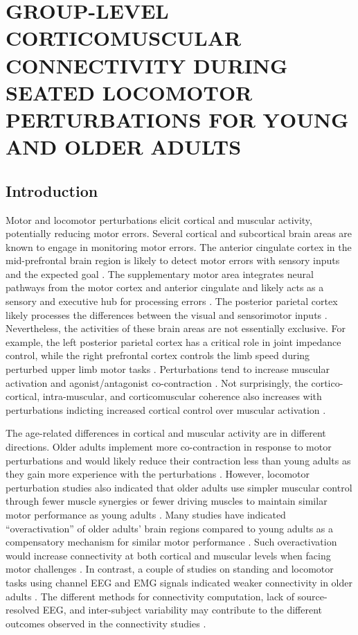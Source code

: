 \documentclass[../thesis_seyed.tex]{subfiles}
\begin{document}
\chapter{GROUP-LEVEL CORTICOMUSCULAR CONNECTIVITY DURING SEATED LOCOMOTOR PERTURBATIONS FOR YOUNG AND OLDER ADULTS}
\section{Introduction}

Motor and locomotor perturbations elicit cortical and muscular activity, potentially reducing motor errors. Several cortical and subcortical brain areas are known to engage in monitoring motor errors. The anterior cingulate cortex in the mid-prefrontal brain region is likely to detect motor errors with sensory inputs and the expected goal \cite{Holroyd2002-fl}. The supplementary motor area integrates neural pathways from the motor cortex and anterior cingulate and likely acts as a sensory and executive hub for processing errors \cite{Peterson2019-wz}. The posterior parietal cortex likely processes the differences between the visual and sensorimotor inputs \cite{Peterson2018-ht}. Nevertheless, the activities of these brain areas are not essentially exclusive. For example, the left posterior parietal cortex has a critical role in joint impedance control, while the right prefrontal cortex controls the limb speed during perturbed upper limb motor tasks \cite{Mutha2014-ea}. Perturbations tend to increase muscular activation and agonist/antagonist co-contraction \cite{Huang2014-to,Thoroughman1999-pz}. Not surprisingly, the cortico-cortical, intra-muscular, and corticomuscular coherence also increases with perturbations indicting increased cortical control over muscular activation \cite{Sato2019-qb,Zandvoort2019-xl,Gentili2015-pq}.

The age-related differences in cortical and muscular activity are in different directions. Older adults implement more co-contraction in response to motor perturbations and would likely reduce their contraction less than young adults as they gain more experience with the perturbations \cite{Huang2014-nh}. However, locomotor perturbation studies also indicated that older adults use simpler muscular control through fewer muscle synergies or fewer driving muscles to maintain similar motor performance as young adults \cite{Allen2018-kd,Da_Silva_Costa2020-vl}. Many studies have indicated “overactivation” of older adults’ brain regions compared to young adults as a compensatory mechanism for similar motor performance \cite{Reuter-Lorenz2008-bn,Seidler2010-yv}. Such overactivation would increase connectivity at both cortical and muscular levels when facing motor challenges \cite{Walker2020-kh,Johnson2012-fv,Kamp2013-ga}. In contrast, a couple of studies on standing and locomotor tasks using channel EEG and EMG signals indicated weaker connectivity in older adults \cite{Roeder2020-tv,Ozdemir2018-yp,Yoshida2017-un}. The different methods for connectivity computation, lack of source-resolved EEG, and inter-subject variability may contribute to the different outcomes observed in the connectivity studies \cite{Clark2019-iv,Holler2017-ac}.
\end{document}
